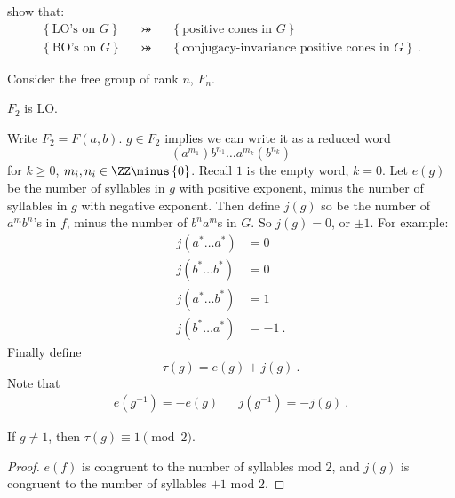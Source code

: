  show that:
\begin{align}
\left\{\text{LO's on }G \right\}
&&\bij&&
\left\{\text{positive cones in } G\right\}
\\
\left\{\text{BO's on }G \right\}
&&\bij&&
\left\{\text{conjugacy-invariance positive cones in }G\right\}
\ .
\end{align}

Consider the free group of rank $n$, $F_n$.
\begin{thm}
$F_2$ is LO.
\end{thm}

\begin{Proof}
Write $F_2 = F\left(a,b\right)$.
$g\in F_2$ implies we can write it as a reduced word
\begin{equation}
\left(a^{m_1}\right)b^{n_1} \ldots a^{m_k}\left(b^{n_k}\right)
\end{equation}
for $k\geq 0$, $m_i , n_i\in \ZZ\minus \left\{0\right\}$.
Recall $1$ is the empty word, $k = 0$.
Let $e\left(g\right)$ be the number of syllables in $g$ with positive exponent, minus
the number of syllables in $g$ with negative exponent. Then define $j\left(g\right)$ so be
the number of $a^mb^n$'s in $f$, minus the number of $b^n a^m$s in $G$. So
$j\left(g\right) = 0$, or $\pm 1$.
For example:
\begin{align}
j\left(a^* \ldots a^*\right) &= 0 \\
j\left(b^* \ldots b^*\right) &= 0 \\
j\left(a^* \ldots b^*\right) &= 1 \\
j\left(b^* \ldots a^*\right) &= -1 \ .
\end{align}
Finally define
\begin{equation}
\tau\left(g\right) = e\left(g\right) + j\left(g\right) \ .
\end{equation}
Note that
\begin{align}
e\left(g^{-1}\right) = - e\left(g\right)
&&
j\left(g^{-1}\right)=  - j\left(g\right) \ .
\end{align}

\begin{lem}
If $g\neq 1$, then $\tau\left(g\right)\equiv 1\pmod{2}$.
\label{lem:1.10}
\end{lem}
\begin{proof}
$e\left(f\right)$ is congruent to the number of syllables mod $2$, and $j\left(g\right)$
is congruent to the number of syllables $+1$ mod $2$.
\end{proof}


\end{Proof}
